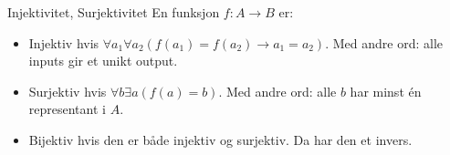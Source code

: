 \begin{frame}{Injektivitet, Surjektivitet}
    En funksjon $f : A \rightarrow B$ er:
    \begin{itemize}
        \item Injektiv hvis $\forall a_1 \forall a_2 (f(a_1) = f(a_2) \rightarrow a_1 = a_2)$.     Med andre ord: alle inputs gir et unikt output.\\
        \item Surjektiv hvis $\forall b \exists a (f(a) = b)$. Med andre ord: alle $b$ har minst én representant i $A$.
        \item Bijektiv hvis den er både injektiv og surjektiv. Da har den et invers.
    \end{itemize}
    \pause
    \begin{figure}%
        \centering
        \qquad
        \qquad
        \qquad
        \label{fig:example1}%
    \end{figure}
\end{frame}

